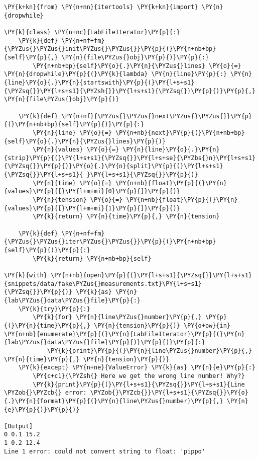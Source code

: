 \begin{Verbatim}[label=\makebox{\url{https://github.com/lucabaldini/cmepda/tree/master/slides/latex/snippets/file\_iterator.py}},commandchars=\\\{\}]
\PY{k+kn}{from} \PY{n+nn}{itertools} \PY{k+kn}{import} \PY{n}{dropwhile}

\PY{k}{class} \PY{n+nc}{LabFileIterator}\PY{p}{:}
    \PY{k}{def} \PY{n+nf+fm}{\PYZus{}\PYZus{}init\PYZus{}\PYZus{}}\PY{p}{(}\PY{n+nb+bp}{self}\PY{p}{,} \PY{n}{file\PYZus{}obj}\PY{p}{)}\PY{p}{:}
        \PY{n+nb+bp}{self}\PY{o}{.}\PY{n}{\PYZus{}lines} \PY{o}{=} \PY{n}{dropwhile}\PY{p}{(}\PY{k}{lambda} \PY{n}{line}\PY{p}{:} \PY{n}{line}\PY{o}{.}\PY{n}{startswith}\PY{p}{(}\PY{l+s+s1}{\PYZsq{}}\PY{l+s+s1}{\PYZsh{}}\PY{l+s+s1}{\PYZsq{}}\PY{p}{)}\PY{p}{,} \PY{n}{file\PYZus{}obj}\PY{p}{)}
        
    \PY{k}{def} \PY{n+nf}{\PYZus{}\PYZus{}next\PYZus{}\PYZus{}}\PY{p}{(}\PY{n+nb+bp}{self}\PY{p}{)}\PY{p}{:}
        \PY{n}{line} \PY{o}{=} \PY{n+nb}{next}\PY{p}{(}\PY{n+nb+bp}{self}\PY{o}{.}\PY{n}{\PYZus{}lines}\PY{p}{)}
        \PY{n}{values} \PY{o}{=} \PY{n}{line}\PY{o}{.}\PY{n}{strip}\PY{p}{(}\PY{l+s+s1}{\PYZsq{}}\PY{l+s+se}{\PYZbs{}n}\PY{l+s+s1}{\PYZsq{}}\PY{p}{)}\PY{o}{.}\PY{n}{split}\PY{p}{(}\PY{l+s+s1}{\PYZsq{}}\PY{l+s+s1}{ }\PY{l+s+s1}{\PYZsq{}}\PY{p}{)}
        \PY{n}{time} \PY{o}{=} \PY{n+nb}{float}\PY{p}{(}\PY{n}{values}\PY{p}{[}\PY{l+m+mi}{0}\PY{p}{]}\PY{p}{)}
        \PY{n}{tension} \PY{o}{=} \PY{n+nb}{float}\PY{p}{(}\PY{n}{values}\PY{p}{[}\PY{l+m+mi}{1}\PY{p}{]}\PY{p}{)}
        \PY{k}{return} \PY{n}{time}\PY{p}{,} \PY{n}{tension}
    
    \PY{k}{def} \PY{n+nf+fm}{\PYZus{}\PYZus{}iter\PYZus{}\PYZus{}}\PY{p}{(}\PY{n+nb+bp}{self}\PY{p}{)}\PY{p}{:}
        \PY{k}{return} \PY{n+nb+bp}{self}

\PY{k}{with} \PY{n+nb}{open}\PY{p}{(}\PY{l+s+s1}{\PYZsq{}}\PY{l+s+s1}{snippets/data/fake\PYZus{}measurements.txt}\PY{l+s+s1}{\PYZsq{}}\PY{p}{)} \PY{k}{as} \PY{n}{lab\PYZus{}data\PYZus{}file}\PY{p}{:}
    \PY{k}{try}\PY{p}{:}
        \PY{k}{for} \PY{n}{line\PYZus{}number}\PY{p}{,} \PY{p}{(}\PY{n}{time}\PY{p}{,} \PY{n}{tension}\PY{p}{)} \PY{o+ow}{in} \PY{n+nb}{enumerate}\PY{p}{(}\PY{n}{LabFileIterator}\PY{p}{(}\PY{n}{lab\PYZus{}data\PYZus{}file}\PY{p}{)}\PY{p}{)}\PY{p}{:}
            \PY{k}{print}\PY{p}{(}\PY{n}{line\PYZus{}number}\PY{p}{,} \PY{n}{time}\PY{p}{,} \PY{n}{tension}\PY{p}{)}
    \PY{k}{except} \PY{n+ne}{ValueError} \PY{k}{as} \PY{n}{e}\PY{p}{:}
        \PY{c+c1}{\PYZsh{} Here we get the wrong line number! Why?}
        \PY{k}{print}\PY{p}{(}\PY{l+s+s1}{\PYZsq{}}\PY{l+s+s1}{Line \PYZob{}\PYZcb{} error: \PYZob{}\PYZcb{}}\PY{l+s+s1}{\PYZsq{}}\PY{o}{.}\PY{n}{format}\PY{p}{(}\PY{n}{line\PYZus{}number}\PY{p}{,} \PY{n}{e}\PY{p}{)}\PY{p}{)}

[Output]
0 0.1 15.2
1 0.2 12.4
Line 1 error: could not convert string to float: 'pippo'
\end{Verbatim}